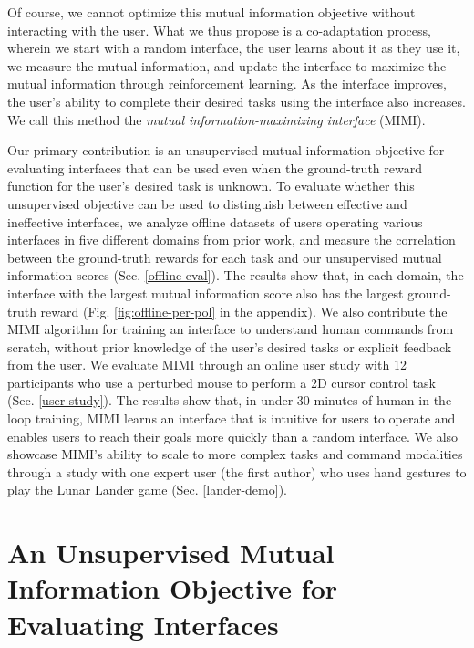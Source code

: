 \documentclass{article}
\begin{document}
Of course, we cannot optimize this mutual information objective without interacting with the user.
What we thus propose is a co-adaptation process, wherein we start with a random interface, the user learns about it as they use it, we measure the mutual information, and update the interface to maximize the mutual information through reinforcement learning.
As the interface improves, the user's ability to complete their desired tasks using the interface also increases.
We call this method the \emph{mutual information-maximizing interface} (MIMI). 

Our primary contribution is an unsupervised mutual information objective for evaluating interfaces that can be used even when the ground-truth reward function for the user's desired task is unknown.
To evaluate whether this unsupervised objective can be used to distinguish between effective and ineffective interfaces, we analyze offline datasets of users operating various interfaces in five different domains from prior work, and measure the correlation between the ground-truth rewards for each task and our unsupervised mutual information scores (Sec. \ref{offline-eval}).
The results show that, in each domain, the interface with the largest mutual information score also has the largest ground-truth reward (Fig. \ref{fig:offline-per-pol} in the appendix).
We also contribute the MIMI algorithm for training an interface to understand human commands from scratch, without prior knowledge of the user's desired tasks or explicit feedback from the user.
We evaluate MIMI through an online user study with 12 participants who use a perturbed mouse to perform a 2D cursor control task (Sec. \ref{user-study}).
The results show that, in under 30 minutes of human-in-the-loop training, MIMI learns an interface that is intuitive for users to operate and enables users to reach their goals more quickly than a random interface.
We also showcase MIMI's ability to scale to more complex tasks and command modalities through a study with one expert user (the first author) who uses hand gestures to play the Lunar Lander game (Sec. \ref{lander-demo}).

\section{An Unsupervised Mutual Information Objective for Evaluating Interfaces}
\end{document}
